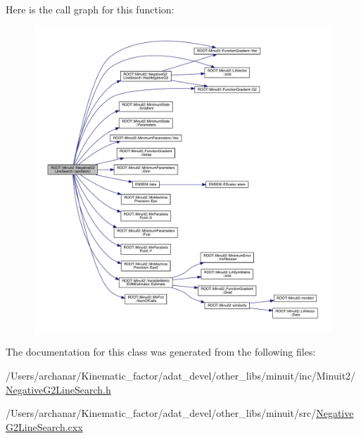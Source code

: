 Here is the call graph for this function\+:\nopagebreak
\begin{figure}[H]
\begin{center}
\leavevmode
\includegraphics[width=350pt]{d3/d6b/classROOT_1_1Minuit2_1_1NegativeG2LineSearch_ac39ff4c0d14335bd8c8bdcede066ecdf_cgraph}
\end{center}
\end{figure}


The documentation for this class was generated from the following files\+:\begin{DoxyCompactItemize}
\item 
/\+Users/archanar/\+Kinematic\+\_\+factor/adat\+\_\+devel/other\+\_\+libs/minuit/inc/\+Minuit2/\mbox{\hyperlink{other__libs_2minuit_2inc_2Minuit2_2NegativeG2LineSearch_8h}{Negative\+G2\+Line\+Search.\+h}}\item 
/\+Users/archanar/\+Kinematic\+\_\+factor/adat\+\_\+devel/other\+\_\+libs/minuit/src/\mbox{\hyperlink{NegativeG2LineSearch_8cxx}{Negative\+G2\+Line\+Search.\+cxx}}\end{DoxyCompactItemize}
